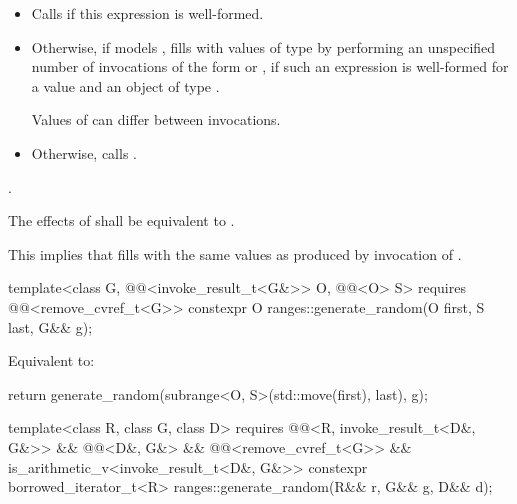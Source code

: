 \begin{itemdescr}
\pnum
\effects
\begin{itemize}
\item
Calls 
if this expression is well-formed.
\item
Otherwise, if  models ,
fills  with  values of
type  by performing
an unspecified number of invocations of
the form  or ,
if such an expression is well-formed for a value  and
an object  of type .
\begin{note}
Values of  can differ between invocations.
\end{note}
\item
Otherwise, calls .
\end{itemize}

\pnum
\returns
{}.

\pnum
\remarks
The effects of  shall be equivalent to
.
\begin{note}
This implies that  fills 
with the same values as produced by invocation of .
\end{note}
\end{itemdescr}

%
\begin{itemdecl}
template<class G, @@<invoke_result_t<G&>> O, @@<O> S>
  requires @@<remove_cvref_t<G>>
  constexpr O ranges::generate_random(O first, S last, G&& g);
\end{itemdecl}

\begin{itemdescr}
\pnum
\effects
Equivalent to:
\begin{codeblock}
return generate_random(subrange<O, S>(std::move(first), last), g);
\end{codeblock}
\end{itemdescr}

%
\begin{itemdecl}
template<class R, class G, class D>
  requires @@<R, invoke_result_t<D&, G&>> && @@<D&, G&> &&
           @@<remove_cvref_t<G>> &&
           is_arithmetic_v<invoke_result_t<D&, G&>>
  constexpr borrowed_iterator_t<R> ranges::generate_random(R&& r, G&& g, D&& d);
\end{itemdecl}

